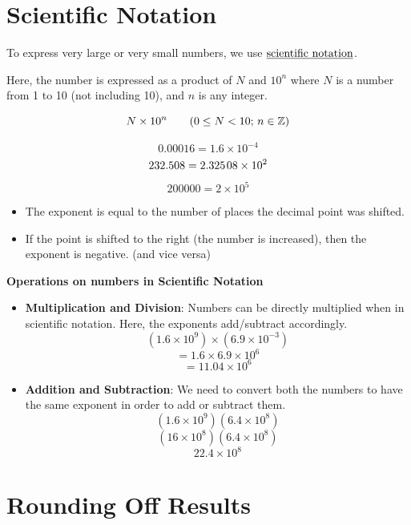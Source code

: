 \documentclass[
  14pt,
]{extarticle}
\providecommand{\tightlist}{%
  \setlength{\itemsep}{0pt}\setlength{\parskip}{0pt}}
\renewenvironment{quote}{\begin{myquote}}{\end{myquote}}
\begin{document}
\hypertarget{scientific-notation}{%
\section{Scientific Notation}\label{scientific-notation}}

To express very large or very small numbers, we use
\(\text{\underline{scientific notation}}\).

Here, the number is expressed as a product of \(N\) and \(10^n\) where
\(N\) is a number from 1 to 10 (not including 10), and \(n\) is any
integer.

\[N\times 10^n\tag{$0\le N<10$; $n\in \mathbb{Z}$}\]

\[0.00016={1.6\times 10^{-4}}\]
\[232.508={2.325\mkern2mu 08\times 10^{2}}\] \[200000={2\times 10^{5}}\]

\begin{quote}
\begin{itemize}
\tightlist
\item
  The exponent is equal to the number of places the decimal point was
  shifted.
\item
  If the point is shifted to the right (the number is increased), then
  the exponent is negative. (and vice versa)
\end{itemize}
\end{quote}

\begin{quote}
\textbf{Operations on numbers in Scientific Notation}

\begin{itemize}
\item
  \textbf{Multiplication and Division}: Numbers can be directly
  multiplied when in scientific notation. Here, the exponents
  add/subtract accordingly.
  \[({1.6\times 10^{9}})\times({6.9\times 10^{-3}})\]
  \[=1.6\times 6.9\times 10^{6}\] \[=11.04\times 10^{6}\]
\item
  \textbf{Addition and Subtraction}: We need to convert both the numbers
  to have the same exponent in order to add or subtract them.
  \[({1.6\times 10^{9}}) ({6.4\times 10^{8}})\]
  \[({16\times 10^{8}}) ({6.4\times 10^{8}})\] \[22.4\times 10^8\]
\end{itemize}
\end{quote}

\hypertarget{rounding-off-results}{%
\section{Rounding Off Results}\label{rounding-off-results}}
\end{document}
